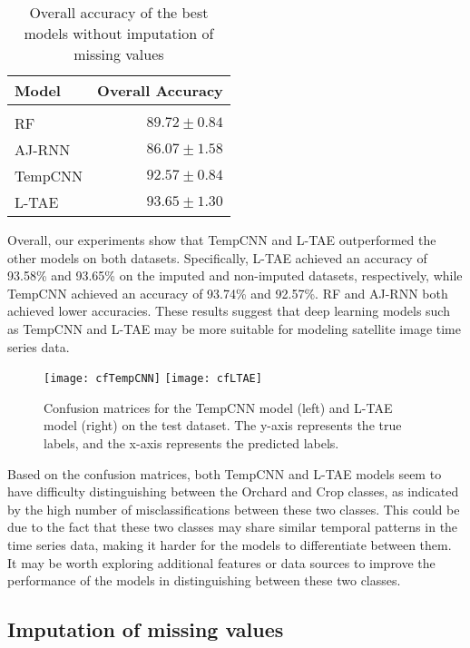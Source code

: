 \begin{table}[H]
  \centering
    \begin{tabular}{lr}
    Model                       & Overall Accuracy             \\[0.2cm] 
    \hline \\[-0.2cm]
    RF      & $89.72 \pm 0.84$\\
    AJ-RNN  & $86.07 \pm 1.58$\\
    TempCNN & $92.57 \pm 0.84$\\
    L-TAE   & $93.65 \pm 1.30$
    \end{tabular}
  \caption{Overall accuracy of the best models without imputation of missing values} 
  \label{tab:ALLresultsNoImputed}
\end{table}

Overall, our experiments show that TempCNN and L-TAE outperformed the other models on both datasets.
Specifically, L-TAE achieved an accuracy of 93.58\% and 93.65\% on the imputed and non-imputed datasets, respectively, 
while TempCNN achieved an accuracy of 93.74\% and 92.57\%. RF and AJ-RNN both achieved lower accuracies. 
These results suggest that deep learning models such as TempCNN and L-TAE may be more suitable for modeling satellite image time series data.

\begin{figure}[H]
  \centering
  \texttt{[image: cfTempCNN]}
  \texttt{[image: cfLTAE]}
  \caption{Confusion matrices for the TempCNN model (left) and L-TAE model (right) on the test dataset. The y-axis represents the true labels, and the x-axis represents the predicted labels.}
\end{figure}

Based on the confusion matrices, both TempCNN and L-TAE models seem to have difficulty distinguishing between the Orchard and Crop classes, as indicated by the high number of misclassifications between these two classes.
This could be due to the fact that these two classes may share similar temporal patterns in the time series data, making it harder for the models to differentiate between them. 
It may be worth exploring additional features or data sources to improve the performance of the models in distinguishing between these two classes.

\subsection{Imputation of missing values}

